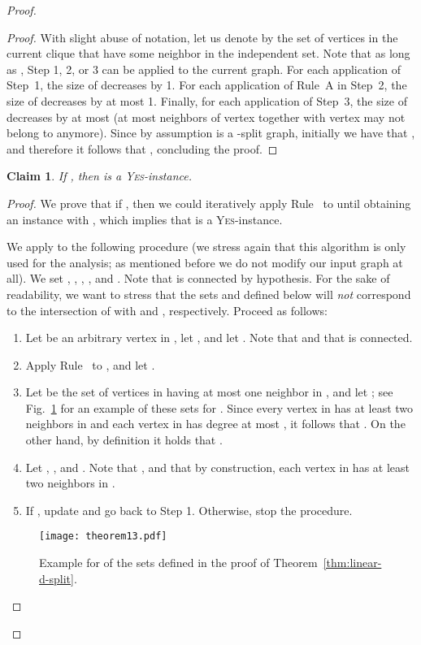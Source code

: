 \documentclass[
final
]{dmtcs-episciences}
\newtheorem{claimN}{Claim}{\bfseries}{\itshape}
\begin{document}
\begin{proof}
\begin{proof}
With slight abuse of notation, let us denote by  the set of vertices in the current clique that have some neighbor in the independent set. Note that as long as , Step 1, 2, or 3 can be applied to the current graph. For each application of Step~1, the size of  decreases by 1. For each application of Rule~A in Step~2, the size of  decreases by at most 1. Finally, for each application of Step~3, the size of  decreases by at most  (at most  neighbors of vertex  together with vertex  may not belong to  anymore). Since by assumption  is a -split graph, initially we have that , and therefore it follows that , concluding the proof.\end{proof}

\begin{claimN}\label{claim:indep-set}
If , then  is a \textsc{Yes}-instance.
\end{claimN}
\begin{proof}
We prove that if , then we could iteratively apply Rule~ to  until obtaining an instance  with , which implies that  is a  \textsc{Yes}-instance.

We apply to  the following procedure (we stress again that this algorithm is only used for the analysis; as mentioned before we do not modify our input graph at all). We set , , ,  , and . Note that  is connected by hypothesis. For the sake of readability, we want to stress that the sets   and  defined below will {\sl not} correspond to the intersection of  with  and , respectively.  Proceed as follows:

\begin{enumerate}
\item Let  be an arbitrary vertex in , let , and let . Note that  and that   is connected.
\item Apply Rule~ to , and let .
\item Let  be the set of vertices in  having at most one neighbor in , and let ; see Fig.~\ref{fig-linear-kernel} for an example of these sets for . Since every vertex in  has at least two neighbors in  and each vertex in  has degree at most , it follows that . On the other hand, by definition it holds that .
\item Let ,  , and . Note that , and that by construction, each vertex in  has at least two neighbors in .
\item If , update  and go back to Step 1. Otherwise, stop the procedure.
\end{enumerate}

\begin{figure}[h]
\begin{center}\texttt{[image: theorem13.pdf]}\vspace{-.6cm}
\caption{Example for  of the sets defined in the proof of Theorem~\ref{thm:linear-d-split}.} \label{fig-linear-kernel}
\end{center}
\end{figure}


\end{proof}
\end{proof}
\end{document}
